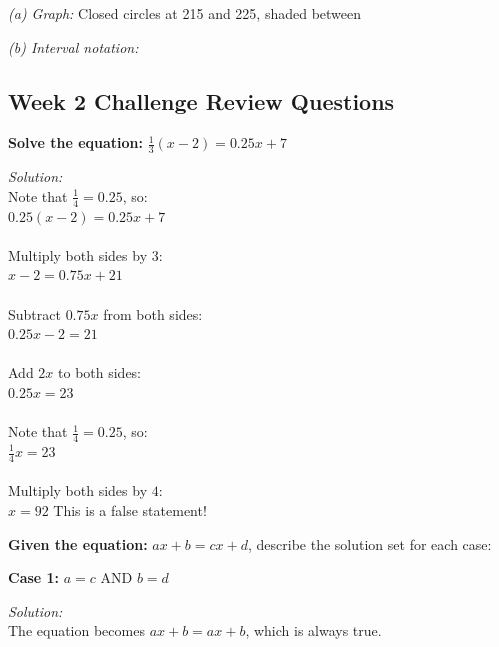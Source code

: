 \documentclass[12pt]{article}
\begin{document}
                \textit{(a) Graph:} Closed circles at 215 and 225, shaded between

                \textit{(b) Interval notation:} \fbox{$[215, 225]$}

                \newpage

        \subsection*{Week 2 Challenge Review Questions}

            \textbf{Solve the equation:} $\frac{1}{3}(x - 2) = 0.25x + 7$

                \textit{Solution:}\\
                Note that $\frac{1}{4} = 0.25$, so:\\
                $0.25(x - 2) = 0.25x + 7$\\
                \\
                Multiply both sides by $3$:\\
                $x - 2 = 0.75x + 21$\\
                \\
                Subtract $0.75x$ from both sides:\\
                $0.25x - 2 = 21$\\
                \\
                Add $2x$ to both sides:\\
                $0.25x = 23$\\
                \\
                Note that $\frac{1}{4} = 0.25$, so:\\
                $\frac{1}{4}x = 23$\\
                \\
                Multiply both sides by $4$:\\
                $x = 92$
                This is a false statement!


                \vspace{0.5cm}

            \textbf{Given the equation:} $ax + b = cx + d$, describe the solution set for each case:

                \textbf{Case 1:} $a = c$ AND $b = d$

                \textit{Solution:}\\
                The equation becomes $ax + b = ax + b$, which is always true.
\end{document}
